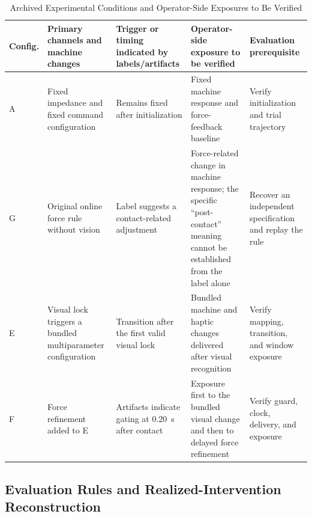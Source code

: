 \documentclass[journal]{IEEEtran}
\begin{document}
\begin{table}[t]
\caption{Archived Experimental Conditions and Operator-Side Exposures to Be Verified}
\label{tab:conditions}
\centering
\scriptsize
\begin{tabularx}{\textwidth}{@{}p{}p{}p{}Yp{0.20\textwidth}@{}}
\toprule
Config. & Primary channels and machine changes & Trigger or timing indicated by labels/artifacts & Operator-side exposure to be verified & Evaluation prerequisite \\
\midrule
A & Fixed impedance and fixed command configuration & Remains fixed after initialization & Fixed machine response and force-feedback baseline & Verify initialization and trial trajectory \\
G & Original online force rule without vision & Label suggests a contact-related adjustment & Force-related change in machine response; the specific ``post-contact'' meaning cannot be established from the label alone & Recover an independent specification and replay the rule \\
E & Visual lock triggers a bundled multiparameter configuration & Transition after the first valid visual lock & Bundled machine and haptic changes delivered after visual recognition & Verify mapping, transition, and window exposure \\
F & Force refinement added to E & Artifacts indicate gating at 0.20~s after contact & Exposure first to the bundled visual change and then to delayed force refinement & Verify guard, clock, delivery, and exposure \\
\bottomrule
\end{tabularx}
\end{table}

\subsection{Evaluation Rules and Realized-Intervention Reconstruction}
\end{document}
